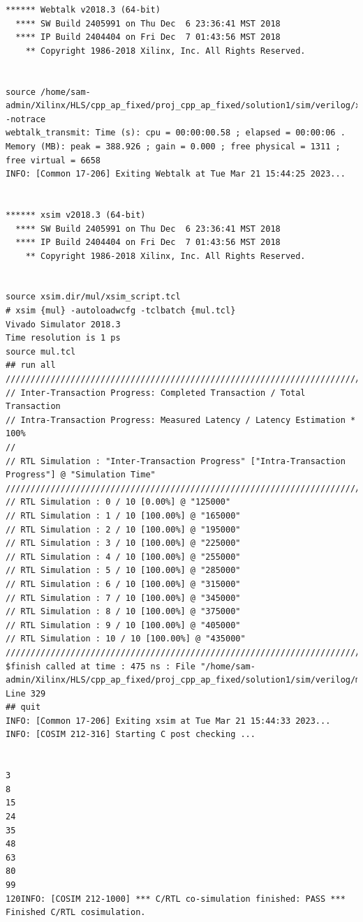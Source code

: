 \documentclass{article}
\begin{document}
\begin{lstlisting}
****** Webtalk v2018.3 (64-bit)
  **** SW Build 2405991 on Thu Dec  6 23:36:41 MST 2018
  **** IP Build 2404404 on Fri Dec  7 01:43:56 MST 2018
    ** Copyright 1986-2018 Xilinx, Inc. All Rights Reserved.


source /home/sam-admin/Xilinx/HLS/cpp_ap_fixed/proj_cpp_ap_fixed/solution1/sim/verilog/xsim.dir/mul/webtalk/xsim_webtalk.tcl -notrace
webtalk_transmit: Time (s): cpu = 00:00:00.58 ; elapsed = 00:00:06 . Memory (MB): peak = 388.926 ; gain = 0.000 ; free physical = 1311 ; free virtual = 6658
INFO: [Common 17-206] Exiting Webtalk at Tue Mar 21 15:44:25 2023...


****** xsim v2018.3 (64-bit)
  **** SW Build 2405991 on Thu Dec  6 23:36:41 MST 2018
  **** IP Build 2404404 on Fri Dec  7 01:43:56 MST 2018
    ** Copyright 1986-2018 Xilinx, Inc. All Rights Reserved.


source xsim.dir/mul/xsim_script.tcl
# xsim {mul} -autoloadwcfg -tclbatch {mul.tcl}
Vivado Simulator 2018.3
Time resolution is 1 ps
source mul.tcl
## run all
////////////////////////////////////////////////////////////////////////////////////
// Inter-Transaction Progress: Completed Transaction / Total Transaction
// Intra-Transaction Progress: Measured Latency / Latency Estimation * 100%
//
// RTL Simulation : "Inter-Transaction Progress" ["Intra-Transaction Progress"] @ "Simulation Time"
////////////////////////////////////////////////////////////////////////////////////
// RTL Simulation : 0 / 10 [0.00%] @ "125000"
// RTL Simulation : 1 / 10 [100.00%] @ "165000"
// RTL Simulation : 2 / 10 [100.00%] @ "195000"
// RTL Simulation : 3 / 10 [100.00%] @ "225000"
// RTL Simulation : 4 / 10 [100.00%] @ "255000"
// RTL Simulation : 5 / 10 [100.00%] @ "285000"
// RTL Simulation : 6 / 10 [100.00%] @ "315000"
// RTL Simulation : 7 / 10 [100.00%] @ "345000"
// RTL Simulation : 8 / 10 [100.00%] @ "375000"
// RTL Simulation : 9 / 10 [100.00%] @ "405000"
// RTL Simulation : 10 / 10 [100.00%] @ "435000"
////////////////////////////////////////////////////////////////////////////////////
$finish called at time : 475 ns : File "/home/sam-admin/Xilinx/HLS/cpp_ap_fixed/proj_cpp_ap_fixed/solution1/sim/verilog/mul.autotb.v" Line 329
## quit
INFO: [Common 17-206] Exiting xsim at Tue Mar 21 15:44:33 2023...
INFO: [COSIM 212-316] Starting C post checking ...


3
8
15
24
35
48
63
80
99
120INFO: [COSIM 212-1000] *** C/RTL co-simulation finished: PASS ***
Finished C/RTL cosimulation.



\end{lstlisting}
\end{document}
